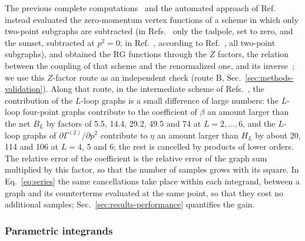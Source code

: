 The previous complete computations~\cite{NMB1977,BNM1978,Phi4tools2024} and the automated approach of
Ref.~\cite{Ribeca2003thesis} instead evaluated the zero-momentum vertex functions of a scheme in which only two-point
subgraphs are subtracted (in Refs.~\cite{Ribeca2003thesis,Phi4tools2024} only the tadpole, set to zero, and the sunset,
subtracted at $p^2=0$; in Ref.~\cite{NMB1977}, according to Ref.~\cite{Phi4tools2024}, all two-point subgraphs),
and obtained the RG functions through the $Z$ factors, the relation between the coupling of that scheme and the
renormalized one, and its inverse~\cite{Ribeca2003thesis}; we use this $Z$-factor route as an independent check
(route B, Sec.~\ref{sec:methods-validation}). Along that route, in the intermediate scheme of
Refs.~\cite{Ribeca2003thesis,Phi4tools2024}, the contribution of the $L$-loop graphs is a small difference of large numbers: the $L$-loop four-point graphs contribute
to the coefficient of $\beta$ an amount larger than the net $B_L$ by factors of 5.5, 14.4, 29.2, 49.5 and 74 at
$L=2,\dots,6$, and the $L$-loop graphs of $\partial\Gamma^{(2)}/\partial p^2$ contribute to $\eta$ an amount larger than
$H_L$ by about 20, 114 and 106 at $L=4$, 5 and 6; the rest is cancelled by products of lower orders. The relative
error of the coefficient is the relative error of the graph sum multiplied by this factor, so that the number of samples
grows with its square. In Eq.~\eqref{eq:series} the same cancellations take place within each integrand, between a
graph and its counterterms evaluated at the same point, so that they cost no additional samples;
Sec.~\ref{sec:results-performance} quantifies the gain.

\subsubsection{Parametric integrands}
\label{sec:methods-param}

